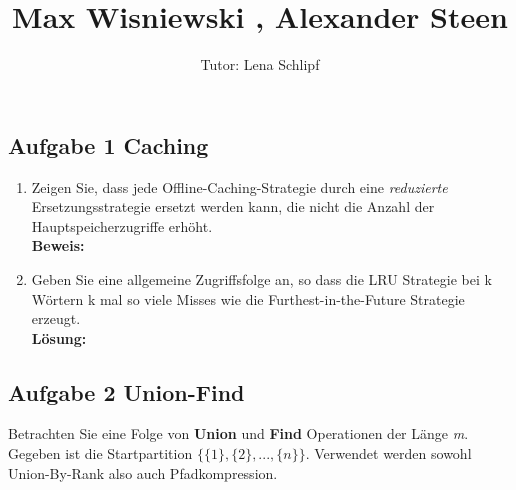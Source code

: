 \documentclass[11pt,a4paper,ngerman]{article}
\author{Tutor: Lena Schlipf}
\date{}
\title{Max Wisniewski , Alexander Steen}
\begin{document}

\maketitle
\thispagestyle{fancy}

\subsection*{Aufgabe 1 \mdseries Caching}

\begin{enumerate}[\bfseries (a)]

\item Zeigen Sie, dass jede Offline-Caching-Strategie durch eine \emph{reduzierte} Ersetzungsstrategie ersetzt werden kann, die nicht die Anzahl der Hauptspeicherzugriffe erhöht.\\

\textbf{Beweis:}\\

\item Geben Sie eine allgemeine Zugriffsfolge an, so dass die LRU Strategie bei k Wörtern k mal so viele Misses wie die Furthest-in-the-Future Strategie erzeugt.\\

\textbf{Lösung:}\\


\end{enumerate}

\subsection*{Aufgabe 2 \mdseries Union-Find}

Betrachten Sie eine Folge von \textbf{Union} und \textbf{Find} Operationen der Länge \emph{m}. Gegeben ist die Startpartition $\{\{ 1 \} , \{ 2 \} , ... , \{ n \} \}$. Verwendet werden sowohl Union-By-Rank also auch Pfadkompression.
\end{document}
